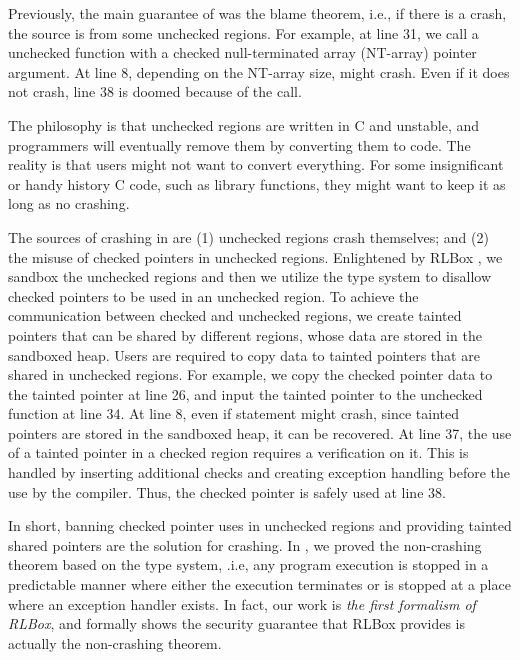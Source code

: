 Previously, the main guarantee of \checkedc \cite{li22checkedc} was the blame theorem,
i.e., if there is a crash, the source is from some unchecked regions.
For example, at  line 31,
we call a unchecked function  with a checked null-terminated array (NT-array) pointer argument.
At line 8, depending on the NT-array size,  might crash.
Even if it does not crash, line 38 is doomed because of the  call.

The philosophy is that unchecked regions are written in C and unstable,
and programmers will eventually remove them by converting them to \checkedc code.
The reality is that users might not want to convert everything.
For some insignificant or handy history C code, such as library functions,
they might want to keep it as long as no crashing.

The sources of crashing in \checkedc are (1) unchecked regions crash themselves;
  and (2) the misuse of checked pointers in unchecked regions.
Enlightened by RLBox \cite{rlbox-paper},
we sandbox the unchecked regions and then we utilize the \checkedc type system
to disallow checked pointers to be used in an unchecked region. 
To achieve the communication between checked and unchecked regions,
we create tainted pointers that can be shared by different regions,
whose data are stored in the sandboxed heap.
Users are required to copy data to tainted pointers that are shared in unchecked regions.
For example,  we copy the checked pointer data to the tainted pointer 
at  line 26,
and input the tainted pointer to the unchecked function at line 34.
At line 8, even if statement might crash, since tainted pointers are stored
in the sandboxed heap, it can be recovered.
At line 37, the use of a tainted pointer in a checked region
requires a verification on it.
This is handled by inserting additional checks
and creating exception handling before the use by the \systemname compiler.
Thus, the checked pointer  is safely used at line 38.

In short, banning checked pointer uses in unchecked regions and providing tainted shared pointers
are the solution for crashing. 
In \systemname, we proved the non-crashing theorem based on the \systemname type system,
.i.e, any program execution is stopped in a predictable manner
where either the execution terminates or is stopped at a place where an exception handler exists.
In fact, our work is \textit{the first formalism of RLBox},
and formally shows the security guarantee that RLBox provides 
is actually the non-crashing theorem.

